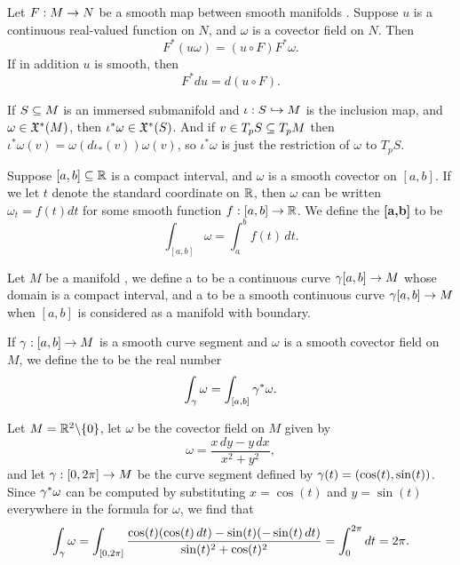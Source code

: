 \setcounter{thm}{24}

\begin{prop}
Let $F:M\rightarrow N$ be a smooth map between smooth manifolds \wowob. Suppose $u$ is a continuous real-valued function on $N$, and $\omega$ is a covector field on $N$. Then
\[F^*(u\omega) = (u\circ F)F^*\omega.\]
If in addition $u$ is smooth, then
\[F^*du = d(u\circ F).\]
\end{prop}

\dfn If $S\subseteq M$ is an immersed submanifold and $\iota:S\hookrightarrow M$ is the inclusion map, and $\omega\in \mathfrak{X}^*(M)$, then $\iota^*\omega\in \mathfrak{X}^*(S)$. And if $v\in T_pS\subseteq T_pM$ then $\iota^*\omega(v) = \omega(d\iota_*(v))\omega(v)$, so $\iota^*\omega$ is just the restriction of $\omega$ to $T_pS$.

\dfn Suppose $[a,b]\subseteq \mathbb{R}$ is a compact interval, and $\omega$ is a smooth covector on $[a,b]$. If we let $t$ denote the standard coordinate on $\mathbb{R}$, then $\omega$ can be written $\omega_t = f(t)dt$ for some smooth function $f:[a,b]\rightarrow \mathbb{R}$. We define the  \textbf{[a,b]} to be
\[\int_{[a,b]}\omega = \int_a^b f(t)\,dt.\]

\dfn Let $M$ be a manifold \wowob, we define a  to be a continuous curve $\gamma[a,b]\rightarrow M$ whose domain is a compact interval, and a   to be a smooth continuous curve $\gamma[a,b]\rightarrow M$ when $[a,b]$ is considered as a manifold with boundary.

\dfn If $\gamma:[a,b]\rightarrow M$ is a smooth curve segment and $\omega$ is a smooth covector field on $M$, we define the  to be the real number
\[\int_\gamma \omega = \int_{[a,b]}\gamma^*\omega.\]

\setcounter{thm}{35}

\begin{ex}
Let $M = \mathbb{R}^2\backslash \{0\}$, let $\omega$ be the covector field on $M$ given by
\[\omega = \frac{x\,dy - y\,dx}{x^2 + y^2},\]
and let $\gamma:[0,2\pi]\rightarrow M$ be the curve segment defined by $\gamma(t) = (\cos(t),\sin(t))$. Since $\gamma^*\omega$ can be computed by substituting $x = \cos(t)$ and $y = \sin(t)$ everywhere in the formula for $\omega$, we find that
\[\int_\gamma \omega = \int_{[0,2\pi]}\frac{\cos(t)(\cos(t)\,dt) - \sin(t)(-\sin(t)\,dt)}{\sin(t)^2 + \cos(t)^2} = \int_0^{2\pi} dt = 2\pi.\]
\end{ex}

\setcounter{thm}{37}

